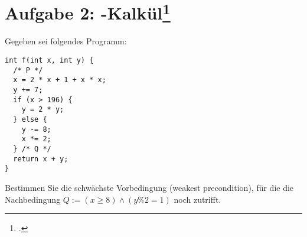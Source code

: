 \documentclass{lehramt-informatik-aufgabe}
\begin{document}
\let\wp=\liWpKalkuel
\let\equivalent=\liWpEquivalent
\let\erklaerung=\liWpErklaerung


\section{Aufgabe 2:
-Kalkül\footcite{sosy:ab:8}}

Gegeben sei folgendes Programm:

\begin{verbatim}
int f(int x, int y) {
  /* P */
  x = 2 * x + 1 + x * x;
  y += 7;
  if (x > 196) {
    y = 2 * y;
  } else {
    y -= 8;
    x *= 2;
  } /* Q */
  return x + y;
}
\end{verbatim}

\noindent
Bestimmen Sie die schwächste Vorbedingung (weakest precondition), für
die die Nachbedingung $Q := (x \geq 8) \land (y \% 2 = 1)$ noch
zutrifft.
\end{document}
